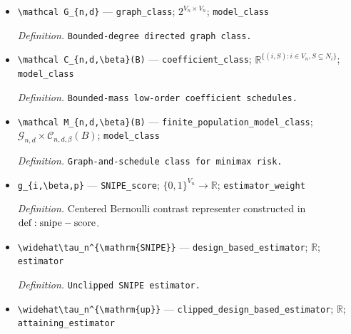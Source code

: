 \documentclass{article}
\begin{document}
\begin{itemize}
  \item \texttt{\textbackslash{}\allowbreak{}mathcal G\_\allowbreak{}\{n,\allowbreak{}d\}\allowbreak{}} --- \texttt{graph\_\allowbreak{}class}; \(2^{V_n\times V_n}\); \texttt{model\_\allowbreak{}class}
  \par\smallskip\noindent\emph{Definition.} \texttt{Bounded-\allowbreak{}degree directed graph class.}
  \item \texttt{\textbackslash{}\allowbreak{}mathcal C\_\allowbreak{}\{n,\allowbreak{}d,\allowbreak{}\textbackslash{}\allowbreak{}beta\}\allowbreak{}(B)} --- \texttt{coefficient\_\allowbreak{}class}; \(\mathbb R^{\{(i,S):i\in V_n,S\subseteq N_i\}}\); \texttt{model\_\allowbreak{}class}
  \par\smallskip\noindent\emph{Definition.} \texttt{Bounded-\allowbreak{}mass low-\allowbreak{}order coefficient schedules.}
  \item \texttt{\textbackslash{}\allowbreak{}mathcal M\_\allowbreak{}\{n,\allowbreak{}d,\allowbreak{}\textbackslash{}\allowbreak{}beta\}\allowbreak{}(B)} --- \texttt{finite\_\allowbreak{}population\_\allowbreak{}model\_\allowbreak{}class}; \(\mathcal G_{n,d}\times\mathcal C_{n,d,\beta}(B)\); \texttt{model\_\allowbreak{}class}
  \par\smallskip\noindent\emph{Definition.} \texttt{Graph-\allowbreak{}and-\allowbreak{}schedule class for minimax risk.}
  \item \texttt{g\_\allowbreak{}\{i,\allowbreak{}\textbackslash{}\allowbreak{}beta,\allowbreak{}p\}\allowbreak{}} --- \texttt{SNIPE\_\allowbreak{}score}; \(\{0,1\}^{V_n}\to\mathbb R\); \texttt{estimator\_\allowbreak{}weight}
  \par\smallskip\noindent\emph{Definition.} Centered Bernoulli contrast representer constructed in \({\rm def:snipe-score}\).
  \item \texttt{\textbackslash{}\allowbreak{}widehat\textbackslash{}\allowbreak{}tau\_\allowbreak{}n\textasciicircum{}\{\textbackslash{}\allowbreak{}mathrm\{SNIPE\}\allowbreak{}\}\allowbreak{}} --- \texttt{design\_\allowbreak{}based\_\allowbreak{}estimator}; \(\mathbb R\); \texttt{estimator}
  \par\smallskip\noindent\emph{Definition.} \texttt{Unclipped SNIPE estimator.}
  \item \texttt{\textbackslash{}\allowbreak{}widehat\textbackslash{}\allowbreak{}tau\_\allowbreak{}n\textasciicircum{}\{\textbackslash{}\allowbreak{}mathrm\{up\}\allowbreak{}\}\allowbreak{}} --- \texttt{clipped\_\allowbreak{}design\_\allowbreak{}based\_\allowbreak{}estimator}; \(\mathbb R\); \texttt{attaining\_\allowbreak{}estimator}

\end{itemize}
\end{document}
